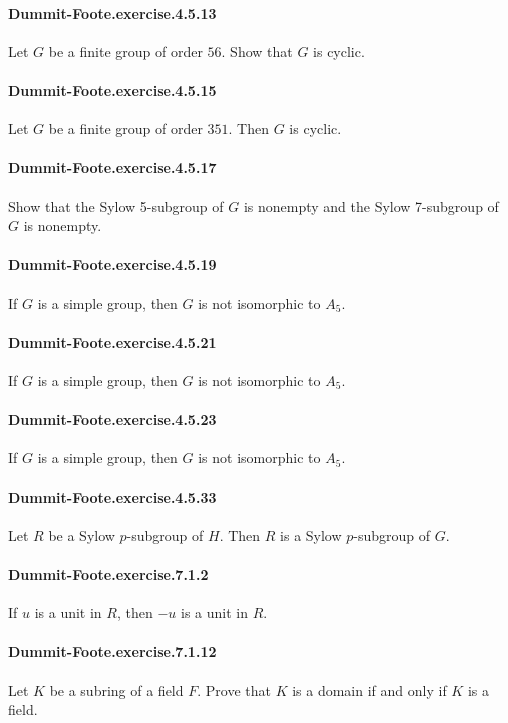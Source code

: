 \documentclass{article}
\begin{document}
\paragraph{Dummit-Foote.exercise.4.5.13} Let $G$ be a finite group of order $56$. Show that $G$ is cyclic.

\paragraph{Dummit-Foote.exercise.4.5.15} Let $G$ be a finite group of order $351$. Then $G$ is cyclic.

\paragraph{Dummit-Foote.exercise.4.5.17} Show that the Sylow 5-subgroup of $G$ is nonempty and the Sylow 7-subgroup of $G$ is nonempty.

\paragraph{Dummit-Foote.exercise.4.5.19} If $G$ is a simple group, then $G$ is not isomorphic to $A_5$.

\paragraph{Dummit-Foote.exercise.4.5.21} If $G$ is a simple group, then $G$ is not isomorphic to $A_5$.

\paragraph{Dummit-Foote.exercise.4.5.23} If $G$ is a simple group, then $G$ is not isomorphic to $A_5$.

\paragraph{Dummit-Foote.exercise.4.5.33} Let $R$ be a Sylow $p$-subgroup of $H$. Then $R$ is a Sylow $p$-subgroup of $G$.

\paragraph{Dummit-Foote.exercise.7.1.2} If $u$ is a unit in $R$, then $-u$ is a unit in $R$. 

\paragraph{Dummit-Foote.exercise.7.1.12} Let $K$ be a subring of a field $F$. Prove that $K$ is a domain if and only if $K$ is a field.
\end{document}

